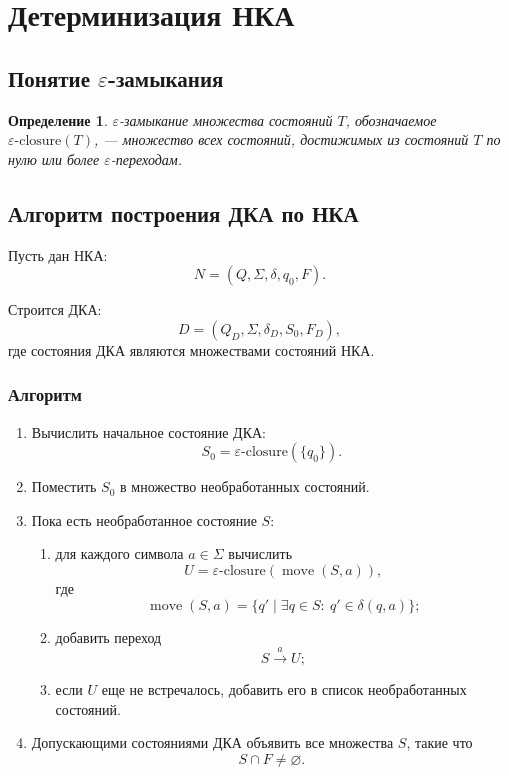 \documentclass[12pt,a4paper]{article}
\newtheorem{definition}{Определение}
\begin{document}
\section{Детерминизация НКА}

\subsection{Понятие $\varepsilon$-замыкания}

\begin{definition}
$\varepsilon$-замыкание множества состояний $T$, обозначаемое $\varepsilon\text{-closure}(T)$, --- множество всех состояний, достижимых из состояний $T$ по нулю или более $\varepsilon$-переходам.
\end{definition}

\subsection{Алгоритм построения ДКА по НКА}

Пусть дан НКА:
\[
N = (Q, \Sigma, \delta, q_0, F).
\]

Строится ДКА:
\[
D = (Q_D, \Sigma, \delta_D, S_0, F_D),
\]
где состояния ДКА являются множествами состояний НКА.

\subsubsection*{Алгоритм}

\begin{enumerate}
    \item Вычислить начальное состояние ДКА:
    \[
    S_0 = \varepsilon\text{-closure}(\{q_0\}).
    \]
    \item Поместить $S_0$ в множество необработанных состояний.
    \item Пока есть необработанное состояние $S$:
    \begin{enumerate}
        \item для каждого символа $a \in \Sigma$ вычислить
        \[
        U = \varepsilon\text{-closure}(\operatorname{move}(S,a)),
        \]
        где
        \[
        \operatorname{move}(S,a)=\{q' \mid \exists q \in S:\ q' \in \delta(q,a)\};
        \]
        \item добавить переход
        \[
        S \xrightarrow{a} U;
        \]
        \item если $U$ еще не встречалось, добавить его в список необработанных состояний.
    \end{enumerate}
    \item Допускающими состояниями ДКА объявить все множества $S$, такие что
    \[
    S \cap F \ne \varnothing.
    \]
\end{enumerate}
\end{document}
